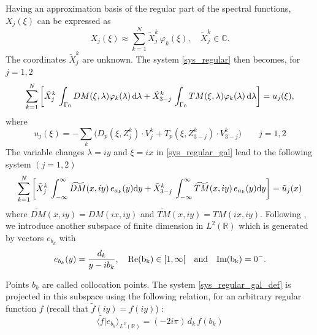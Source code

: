 Having an approximation basis of the regular part of the spectral functions, $X_j(\xi)$ can be expressed as
\begin{equation}
\label{regular_part_decomp}
X_j(\xi) \approx \sum_{k=1}^N \tilde{X}_j^k \, \varphi_k(\xi), \quad \tilde{X}_j^k \in \mathbb{C}.
\end{equation}
The coordinates $\tilde{X}_j^k$ are unknown. The system \eqref{sys_regular} then becomes, for $j=1,2$
\begin{equation}
\label{sys_regular_gal}
\sum_{k=1}^N \left[ \tilde{X}_j^k \, \int_{\Gamma_0} DM(\xi,\lambda) \varphi_k(\lambda) \, {\rm d} \lambda + \tilde{X}_{3-j}^k \, \int_{\Gamma_0} TM(\xi,\lambda) \varphi_k(\lambda) \, {\rm d} \lambda \right] = u_j(\xi), 
\end{equation}
where
\begin{equation}
\label{second_member}
u_j(\xi) = -\sum_k \Big( D_p(\xi,Z_j^k)\cdot V_j^k+ T_p(\xi,Z_{3-j}^k)\cdot V_{3-j}^k\Big) \qquad j=1,2
\end{equation}
The variable changes $\lambda = iy$ and $\xi = ix$ in \eqref{sys_regular_gal} lead to the following system $(j=1,2)$
\begin{equation}
\label{sys_regular_gal_def}
\sum_{k=1}^N \left[ \tilde{X}_j^k \, \int_{-\infty}^\infty  \widetilde{DM}(x,iy) \, e_{a_k}(y) {\rm d} y + \tilde{X}_{3-j}^k \, \int_{-\infty}^\infty  \widetilde{TM}(x,iy) \, e_{a_k}(y) {\rm d} y \right] = \tilde u_j(x) \\
\end{equation}
where $\widetilde{DM}(x,iy) = DM(ix,iy)$ and $\widetilde{TM}(x,iy) = TM(ix,iy)$. Following \cite{CroisilleLebeau}, we introduce another subspace of finite dimension in $L^2(\mathbb{R})$ which is generated by vectors $e_{b_k}$ with
\begin{equation}
\label{points_collocation}
e_{b_k}(y)=\frac{d_k}{y-ib_k}, \quad  \rm Re (b_k) \in [1,\infty[  \quad \text{and}  \quad {\rm Im} (b_k) = 0^-.
\end{equation}

Points $b_k$ are called collocation points.  The system \eqref{sys_regular_gal_def} is projected in this subspace using the following relation, for an arbitrary regular function $f$ (recall that $\tilde{f}(iy)=f(iy)$) :
\begin{equation}
\label{dot_product}
\langle \tilde f\vert e_{b_k}\rangle_{L^2(\mathbb R)}= (-2i\pi) \, d_k \,  f (b_k)
\end{equation}

